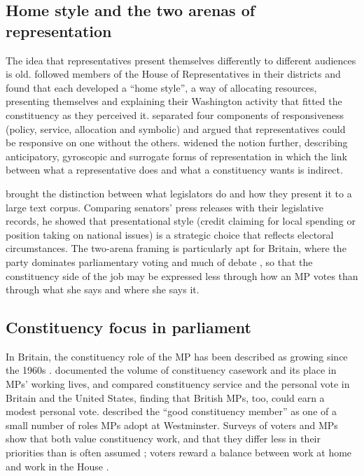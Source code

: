 \documentclass[11pt,a4paper]{article}
\begin{document}
\subsection{Home style and the two arenas of representation}
The idea that representatives present themselves differently to different audiences is old. \citet{fenno1978} followed members of the House of Representatives in their districts and found that each developed a ``home style'', a way of allocating resources, presenting themselves and explaining their Washington activity that fitted the constituency as they perceived it. \citet{eulau1977} separated four components of responsiveness (policy, service, allocation and symbolic) and argued that representatives could be responsive on one without the others. \citet{mansbridge2003} widened the notion further, describing anticipatory, gyroscopic and surrogate forms of representation in which the link between what a representative does and what a constituency wants is indirect.

\citet{grimmer2013} brought the distinction between what legislators do and how they present it to a large text corpus. Comparing senators' press releases with their legislative records, he showed that presentational style (credit claiming for local spending or position taking on national issues) is a strategic choice that reflects electoral circumstances. The two-arena framing is particularly apt for Britain, where the party dominates parliamentary voting and much of debate \citep{proksch2015}, so that the constituency side of the job may be expressed less through how an MP votes than through what she says and where she says it.

\subsection{Constituency focus in parliament}
In Britain, the constituency role of the MP has been described as growing since the 1960s \citep{norton1994}. \citet{norton1993} documented the volume of constituency casework and its place in MPs' working lives, and \citet{cain1987} compared constituency service and the personal vote in Britain and the United States, finding that British MPs, too, could earn a modest personal vote. \citet{searing1985,searing1994} described the ``good constituency member'' as one of a small number of roles MPs adopt at Westminster. Surveys of voters and MPs show that both value constituency work, and that they differ less in their priorities than is often assumed \citep{campbell2015}; voters reward a balance between work at home and work in the House \citep{vivyan2016}.
\end{document}
